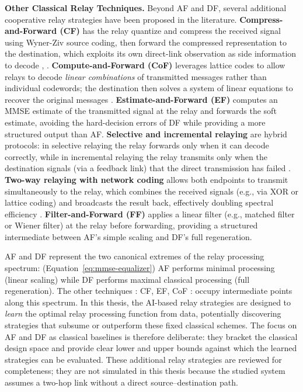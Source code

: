\textbf{Other Classical Relay Techniques.} Beyond AF and DF, several additional cooperative relay strategies have been proposed in the literature. \textbf{Compress-and-Forward (CF)} has the relay quantize and compress the received signal using Wyner-Ziv source coding, then forward the compressed representation to the destination, which exploits its own direct-link observation as side information to decode \cite{CoverGamal1979RelayChannel}, \cite{ElGamalKim2011NetworkIT}. \textbf{Compute-and-Forward (CoF)} leverages lattice codes to allow relays to decode \emph{linear combinations} of transmitted messages rather than individual codewords; the destination then solves a system of linear equations to recover the original messages \cite{NazerGastpar2011ComputeForward}. \textbf{Estimate-and-Forward (EF)} computes an MMSE estimate of the transmitted signal at the relay and forwards the soft estimate, avoiding the hard-decision errors of DF while providing a more structured output than AF. \textbf{Selective and incremental relaying} are hybrid protocols: in selective relaying the relay forwards only when it can decode correctly, while in incremental relaying the relay transmits only when the destination signals (via a feedback link) that the direct transmission has failed \cite{Laneman2004CooperativeDiversity}. \textbf{Two-way relaying with network coding} allows both endpoints to transmit simultaneously to the relay, which combines the received signals (e.g., via XOR or lattice coding) and broadcasts the result back, effectively doubling spectral efficiency \cite{RankovWittneben2007HalfDuplexRelay}. \textbf{Filter-and-Forward (FF)} applies a linear filter (e.g., matched filter or Wiener filter) at the relay before forwarding, providing a structured intermediate between AF's simple scaling and DF's full regeneration.

AF and DF represent the two canonical extremes of the relay processing spectrum: (Equation~\ref{eq:mmse-equalizer}) AF performs minimal processing (linear scaling) while DF performs maximal classical processing (full regeneration). The other techniques : CF, EF, CoF : occupy intermediate points along this spectrum. In this thesis, the AI-based relay strategies are designed to \emph{learn} the optimal relay processing function from data, potentially discovering strategies that subsume or outperform these fixed classical schemes. The focus on AF and DF as classical baselines is therefore deliberate: they bracket the classical design space and provide clear lower and upper bounds against which the learned strategies can be evaluated. These additional relay strategies are reviewed for completeness; they are not simulated in this thesis because the studied system assumes a two-hop link without a direct source--destination path.


